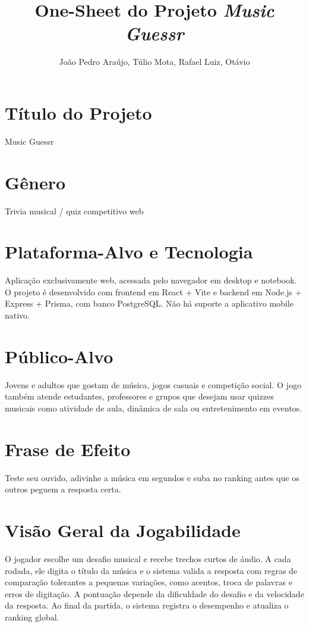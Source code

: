 \documentclass[12pt,a4paper]{article}
\title{One-Sheet do Projeto \textit{Music Guessr}}
\author{João Pedro Araújo, Túlio Mota, Rafael Luiz, Otávio}
\date{}
\begin{document}
\maketitle

\section*{Título do Projeto}
Music Guessr

\section*{Gênero}
Trivia musical / quiz competitivo web

\section*{Plataforma-Alvo e Tecnologia}
Aplicação exclusivamente web, acessada pelo navegador em desktop e notebook. O projeto é desenvolvido com frontend em React + Vite e backend em Node.js + Express + Prisma, com banco PostgreSQL. Não há suporte a aplicativo mobile nativo.

\section*{Público-Alvo}
Jovens e adultos que gostam de música, jogos casuais e competição social. O jogo também atende estudantes, professores e grupos que desejam usar quizzes musicais como atividade de aula, dinâmica de sala ou entretenimento em eventos.

\section*{Frase de Efeito}
Teste seu ouvido, adivinhe a música em segundos e suba no ranking antes que os outros peguem a resposta certa.

\section*{Visão Geral da Jogabilidade}
O jogador escolhe um desafio musical e recebe trechos curtos de áudio. A cada rodada, ele digita o título da música e o sistema valida a resposta com regras de comparação tolerantes a pequenas variações, como acentos, troca de palavras e erros de digitação. A pontuação depende da dificuldade do desafio e da velocidade da resposta. Ao final da partida, o sistema registra o desempenho e atualiza o ranking global.
\end{document}
